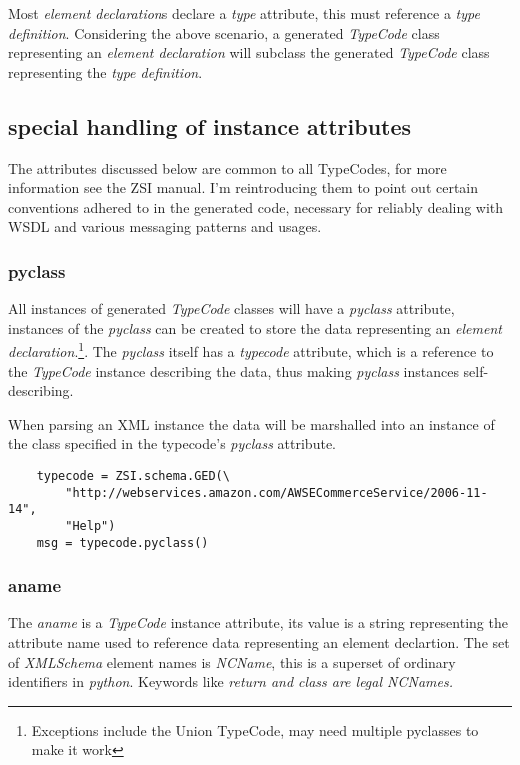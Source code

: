 Most {\it element declaration}s declare a {\it type} attribute, this must
reference a {\it type definition}.  Considering the above scenario, a
generated {\it TypeCode} class representing an {\it element declaration} will
subclass the generated {\it TypeCode} class representing the {\it type 
definition}.

\subsection{special handling of instance attributes}
The attributes discussed below are common to all TypeCodes, for more information
see the ZSI manual.  I'm reintroducing them to point out certain conventions
adhered to in the generated code, necessary for reliably dealing with WSDL and
various messaging patterns and usages.

\subsubsection{pyclass}
All instances of generated {\it TypeCode} classes will have a {\it pyclass}
attribute, instances of the {\it pyclass} can be created to store the data
representing an {\it element declaration}.\footnote{Exceptions include the
Union TypeCode, may need multiple pyclasses to make it work}. The {\it pyclass}
itself has a {\it typecode} attribute, which is a reference to
the {\it TypeCode} instance describing the data, thus making {\it pyclass}
instances self-describing. 

When parsing an XML instance the data will be marshalled into an instance of the
class specified in the typecode's {\it pyclass} attribute.

\begin{verbatim}
    typecode = ZSI.schema.GED(\
        "http://webservices.amazon.com/AWSECommerceService/2006-11-14", 
        "Help")
    msg = typecode.pyclass()
\end{verbatim}
\par

\subsubsection{aname}
The {\it aname} is a {\it TypeCode} instance attribute, its value is a string
representing  the attribute name used to reference data representing an element
declartion. The set  of {\it XMLSchema} element names is {\it NCName}, this is
a superset of ordinary identifiers in {\it python}. Keywords like \it{return}
and \it{class} are legal NCNames.


